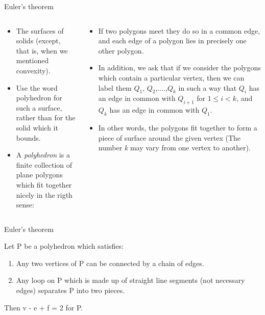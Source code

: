 \documentclass{beamer}
\begin{document}
\begin{frame}{Euler's theorem}
  \begin{columns}
    \begin{column}{0.4\textwidth}
      \begin{block}{}
        \begin{itemize}
        \item The surfaces of solids (except, that is, when we mentioned convexity).
        \item Use the word polyhedron for such a surface, rather than for the solid which it bounds.
        \item A \textsl{polyhedron} is a finite collection of plane polygons which fit together nicely in the rigth sense:
        \end{itemize}
      \end{block}
    \end{column}
    \begin{column}{0.6\textwidth}
      \begin{block}{}
        \begin{itemize}
        \item If two polygons meet they do so in a common edge, and each edge of a polygon lies in precisely one other polygon.
        \item In addition, we ask that if we consider the polygons which contain a particular vertex, then we can label them $Q_1$, $Q_2$,....,$Q_k$ in such a way that $Q_i$ has an edge in common with $Q_{i+1}$ for $1 \leq i < k$, and $Q_k$ has an edge in common with $Q_1$.
        \item In other words, the polygons fit together to form a piece of surface around the given vertex (The number \textsl{k} may vary from one vertex to another).
        \end{itemize}
      \end{block}
    \end{column}
  \end{columns}
\end{frame}

\begin{frame}{Euler's theorem}
  \begin{theorem}
    Let P be a polyhedron which satisfies:
    \begin{enumerate}[label={(\alph*)}]
    \item Any two vertices of P can be connected by a chain of edges.
    \item Any loop on P which is made up of straight line segments (not necessary edges) separates P into two pieces.
    \end{enumerate}
    Then v - e + f = 2 for P.
  \end{theorem}
\end{frame}
\end{document}
